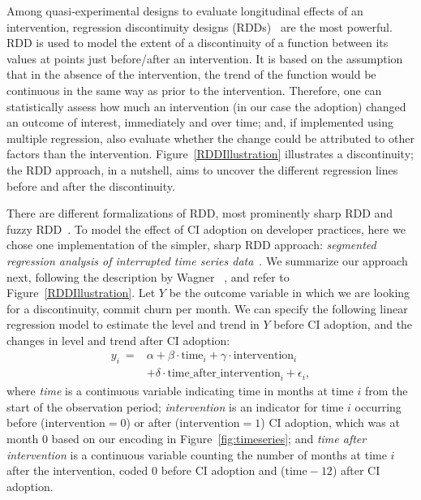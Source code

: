 Among quasi-experimental designs to evaluate longitudinal effects of an 
intervention, regression discontinuity designs (RDDs)~\cite{cook1979quasi} 
are the most powerful.
RDD is used to model the extent of a discontinuity of a function between its 
values at points just before/after an intervention. 
It is based on the assumption that in the absence of the intervention, the 
trend of the function would be continuous in the same way as prior to the 
intervention.
Therefore, one can statistically assess how much an intervention 
(in our case the \Tvi adoption) changed an outcome of interest,  
immediately and over time; and, if implemented using multiple regression, 
also evaluate whether the change could be attributed to other 
factors than the intervention.
Figure~\ref{RDDIllustration} illustrates a discontinuity; the RDD approach, 
in a nutshell, aims to uncover the different regression lines before and after 
the discontinuity.


There are different formalizations of RDD, most prominently 
sharp RDD and fuzzy RDD~\cite{imbens2008regression}.
To model the effect of CI adoption on developer practices, here we chose one 
implementation of the simpler, sharp RDD approach: \emph{segmented regression 
analysis of interrupted time series data}~\cite{wagner2002segmented}.
We summarize our approach next, following the description by Wagner 
\etal~\cite{wagner2002segmented}, and refer to Figure~\ref{RDDIllustration}.
Let $Y$ be the outcome variable in which we are looking for a discontinuity, 
\eg commit churn per month.
We can specify the following linear regression model to estimate the level
and trend in $Y$ before CI adoption, and the changes in level and trend
after CI adoption:
\begin{align}
y_i \ = &\alpha + \beta \cdot \text{time}_i + \gamma \cdot \text{intervention}_i \nonumber \\
	&+ \delta \cdot \text{time\_after\_intervention}_i + \epsilon_i,
\end{align}
where \emph{time} is a continuous variable indicating time in months at 
time $i$ from the start of the observation period;
\emph{intervention} is an indicator for time $i$ occurring before 
($\text{intervention} = 0$) or after ($\text{intervention} = 1$) CI adoption, which 
was at month 0 based on our encoding in Figure~\ref{fig:timeseries};
and \emph{time after intervention} is a continuous variable counting the number 
of months at time $i$ after the intervention, coded 0 before CI adoption and 
($\text{time} - 12$) after CI adoption.

